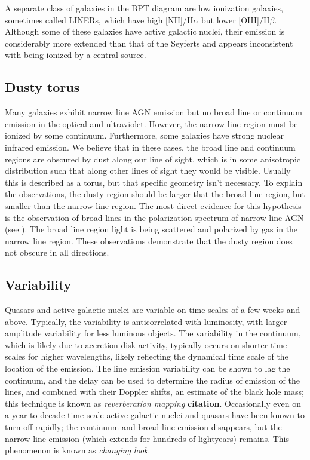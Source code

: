 A separate class of galaxies in the BPT diagram are low ionization
galaxies, sometimes called LINERs, which have high [NII]/H$\alpha$ but
lower [OIII]/H$\beta$. Although some of these galaxies have active
galactic nuclei, their emission is considerably more extended than
that of the Seyferts and appears inconsistent with being ionized by a
central source. 

\subsection{Dusty torus}

Many galaxies exhibit narrow line AGN emission but no broad line or
continuum emission in the optical and ultraviolet. However, the narrow
line region must be ionized by some continuum. Furthermore, some
galaxies have strong nuclear infrared emission. We believe that in
these cases, the broad line and continuum regions are obscured by dust
along our line of sight, which is in some anisotropic distribution
such that along other lines of sight they would be visible. Usually
this is described as a torus, but that specific geometry isn't
necessary. To explain the observations, the dusty region should be
larger that the broad line region, but smaller than the narrow line
region. The most direct evidence for this hypothesis is the
observation of broad lines in the polarization spectrum of narrow line
AGN (see \citealt{antonucci93a}). The broad line region light is being
scattered and polarized by gas in the narrow line region. These
observations demonstrate that the dusty region does not obscure in all
directions.

\subsection{Variability}

Quasars and active galactic nuclei are variable on time scales of a
few weeks and above. Typically, the variability is anticorrelated with
luminosity, with larger amplitude variability for less luminous
objects. The variability in the continuum, which is likely due to
accretion disk activity, typically occurs on shorter time scales for
higher wavelengths, likely reflecting the dynamical time scale of the
location of the emission.  The line emission variability can be shown
to lag the continuum, and the delay can be used to determine the
radius of emission of the lines, and combined with their Doppler
shifts, an estimate of the black hole mass; this technique is known as
{\it reverberation mapping} {\bf citation}. Occasionally even on a
year-to-decade time scale active galactic nuclei and quasars have been
known to turn off rapidly; the continuum and broad line emission
disappears, but the narrow line emission (which extends for hundreds
of lightyears) remains. This phenomenon is known as {\it changing
look}.

